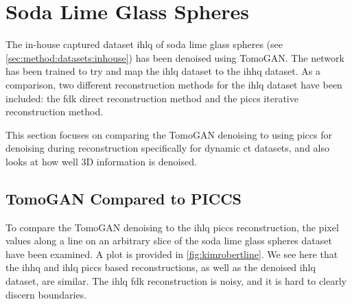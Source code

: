 \section{Soda Lime Glass Spheres}
The in-house captured dataset \gls{ihlq} of soda lime glass spheres (see \cref{sec:method:datasets:inhouse}) has been denoised using TomoGAN. The network has been trained to try and map the \gls{ihlq} dataset to the \gls{ihhq} dataset. As a comparison, two different reconstruction methods for the \gls{ihlq} dataset have been included: the \gls{fdk} direct reconstruction method and the \gls{piccs} iterative reconstruction method. 

This section focuses on comparing the TomoGAN denoising to using \gls{piccs} for denoising during reconstruction specifically for dynamic \gls{ct} datasets, and also looks at how well 3D information is denoised. 

\subsection{TomoGAN Compared to PICCS}
To compare the TomoGAN denoising to the \gls{ihlq} \gls{piccs} reconstruction, the pixel values along a line on an arbitrary slice of the soda lime glass spheres dataset have been examined. A plot is provided in \cref{fig:kimrobertline}. We see here that the \gls{ihhq} and \gls{ihlq} \gls{piccs} based reconstructions, as well as the denoised \gls{ihlq} dataset, are similar. The \gls{ihlq} \gls{fdk} reconstruction is noisy, and it is hard to clearly discern boundaries. 

